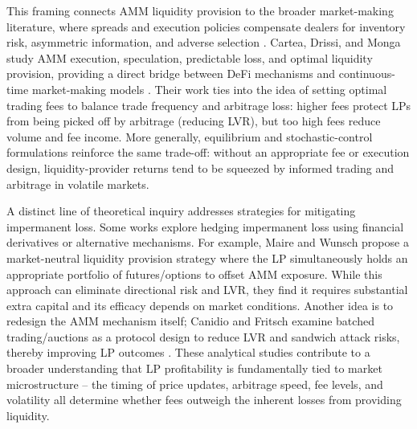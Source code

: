 \documentclass[11pt]{article}
\begin{document}
This framing connects AMM liquidity provision to the broader market-making literature, where spreads and execution policies compensate dealers for inventory risk, asymmetric information, and adverse selection \cite{ho1983,avellaneda2008,cartea2015book,gueant2016book}. Cartea, Drissi, and Monga study AMM execution, speculation, predictable loss, and optimal liquidity provision, providing a direct bridge between DeFi mechanisms and continuous-time market-making models \cite{CARTEA2025105134}. Their work ties into the idea of setting optimal trading fees to balance trade frequency and arbitrage loss: higher fees protect LPs from being picked off by arbitrage (reducing LVR), but too high fees reduce volume and fee income. More generally, equilibrium and stochastic-control formulations reinforce the same trade-off: without an appropriate fee or execution design, liquidity-provider returns tend to be squeezed by informed trading and arbitrage in volatile markets.

A distinct line of theoretical inquiry addresses strategies for mitigating impermanent loss. Some works explore hedging impermanent loss using financial derivatives or alternative mechanisms. For example, Maire and Wunsch \cite{maire2024} propose a market-neutral liquidity provision strategy where the LP simultaneously holds an appropriate portfolio of futures/options to offset AMM exposure. While this approach can eliminate directional risk and LVR, they find it requires substantial extra capital and its efficacy depends on market conditions. Another idea is to redesign the AMM mechanism itself; Canidio and Fritsch examine batched trading/auctions as a protocol design to reduce LVR and sandwich attack risks, thereby improving LP outcomes \cite{canidio2025}. These analytical studies contribute to a broader understanding that LP profitability is fundamentally tied to market microstructure – the timing of price updates, arbitrage speed, fee levels, and volatility all determine whether fees outweigh the inherent losses from providing liquidity.
\end{document}
